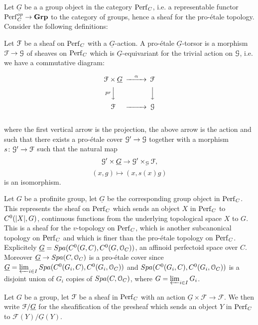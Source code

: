 Let $\underline{G}$ be a a group object in the category $\mathrm{Perf}_{C}$, i.e. a representable functor $\mathrm{Perf}_{C}^{op}\to\mathbf{Grp}$ to the category of groups, hence a sheaf for the pro-\'{e}tale topology.
Consider the following definitions:
\begin{definition}
Let $\mathcal{F}$ be a sheaf on $\mathrm{Perf}_{C}$ with a $\underline{G}$-action.
A pro-\'{e}tale $\underline{G}$-torsor is a morphism $\mathcal{F}\to\mathcal{G}$ of sheaves on $\mathrm{Perf}_{C}$ which is $\underline{G}$-equivariant for the trivial action on $\mathcal{G}$, i.e. we have a commutative diagram:

$$\begin{CD}
\F\times\underline{G}     @>\alpha>>  \F	\\
@VprVV           @VVV                \\
\F    @>>>  \G		
\end{CD}$$\\
where the first vertical arrow is the projection, the above arrow is the action and 
such that there exists a pro-\'{e}tale cover $\mathcal{G}'\to\mathcal{G}$ together with a morphism $s\colon \mathcal{G}'\to\mathcal{F}$ such that the natural map
\[\mathcal{G}'\times\underline{G}\to\mathcal{G}'\times_{\mathcal{G}}\mathcal{F},\]
\[(x,g)\mapsto (x, s(x)g)\]
is an isomorphism.
\end{definition}

Let $G$ be a profinite group, let $\underline{G}$ be the corresponding group object in $\mathrm{Perf}_{C}$. This represents the sheaf on $\mathrm{Perf}_{C}$
which sends an object $X$ in $\mathrm{Perf}_{C}$ to $C^{0}(\lvert X\rvert, G)$, continuous functions from the underlying topological space $X$ to $G$.
This is a sheaf for the $v$-topology on $\mathrm{Perf}_{C}$, which is another subcanonical topology on $\mathrm{Perf}_{C}$ and which is finer than the pro-\'{e}tale topology on $\mathrm{Perf}_{C}$.
Explicitely 
$\underline{G} = {Spa({C^{0}(G, C)},{C^{0}(G, \mathcal{O}_C)})}$, an affinoid perfectoid space over $C$. 
Moreover
$\underline{G}\to{Spa({C},{\mathcal{O}_C})}$ is a  pro-\'{e}tale cover since
$\underline{G} = \varprojlim_{i\in I}{Spa({C^{0}(G_i, C)},{C^{0}(G_i, \mathcal{O}_C)})}$
and ${Spa({C^{0}(G_i, C)},{C^{0}(G_i, \mathcal{O}_C)})}$ is a disjoint union of $G_i$ copies of ${Spa({C},{\mathcal{O}_C})}$, where $G=\varprojlim_{i\in I}G_i$.



\begin{definition}
Let $G$ be a group, let $\mathcal{F}$ be a sheaf in $\mathrm{Perf}_{C}$ with an action $\underline{G}\times\mathcal{F}\to\mathcal{F}$. We then write
$\mathcal{F}/\underline{G}$ for the sheafification of the presheaf which sends an object $Y$ in $\mathrm{Perf}_{C}$ to $\mathcal{F}(Y)/\underline{G}(Y)$.
\end{definition}



